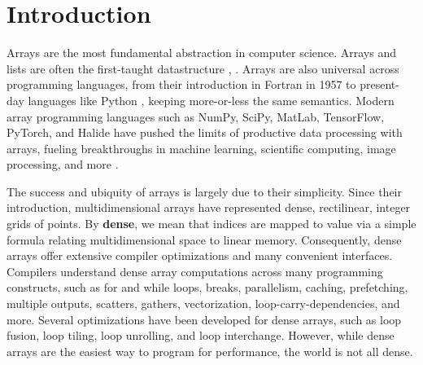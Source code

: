 
\section{Introduction}

Arrays are the most fundamental abstraction in computer science. Arrays and lists are often the first-taught datastructure
\cite[Chapter 2.2]{abelson_structure_1996}, \cite[Chapter 2.2]{knuth_art_1997}.
%
Arrays are also universal across programming languages, from their introduction
in Fortran in 1957 to present-day languages like Python
\cite{backus_fortran_1957}, keeping more-or-less the same semantics.
%
Modern
array programming languages such as NumPy, SciPy, MatLab, TensorFlow, PyTorch,
and Halide have pushed the limits of productive data processing with arrays,
fueling breakthroughs in machine learning, scientific computing, image
processing, and more  \cite{harris_array_2020, virtanen_scipy_2020,
moler_history_2020, abadi_tensorflow_2016,
paszke_pytorch_2019,ragan-kelley_halide_2013}.

The success and ubiquity of arrays is largely due to their simplicity. 
%
Since their introduction, multidimensional arrays have represented dense, rectilinear,
integer grids of points. 
%
By \textbf{dense}, we mean that indices are mapped to value via a simple formula relating multidimensional space to linear memory.
%
Consequently, dense arrays offer extensive compiler optimizations and many convenient interfaces.
%
%
Compilers understand dense array computations across many
programming constructs, such as for and while loops, breaks, parallelism,
caching, prefetching, multiple outputs, scatters, gathers, vectorization,
loop-carry-dependencies, and more. Several optimizations have been developed for
dense arrays, such as loop fusion, loop tiling, loop unrolling, and loop
interchange.
%
However, while dense arrays are the easiest way to program for performance, the world is not all dense.

